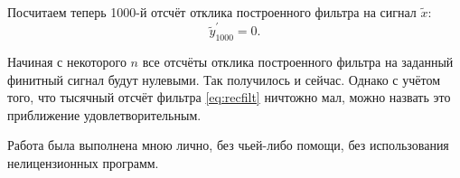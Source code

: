 \documentclass[a4paper,14pt]{article}
\begin{document}
	Посчитаем теперь 1000-й отсчёт отклика построенного фильтра на сигнал $ \widetilde{x} $:
	\[ \widetilde{y}_{1000}^{'} = 0.\]
	
	Начиная с некоторого $n$ все отсчёты отклика построенного фильтра на заданный финитный сигнал будут нулевыми. Так получилось и сейчас. Однако с учётом того, что тысячный отсчёт фильтра \eqref{eq:recfilt} ничтожно мал, можно назвать это приближение удовлетворительным.
	
	Работа была выполнена мною лично, без чьей-либо помощи, без использования нелицензионных программ.
\end{document}
